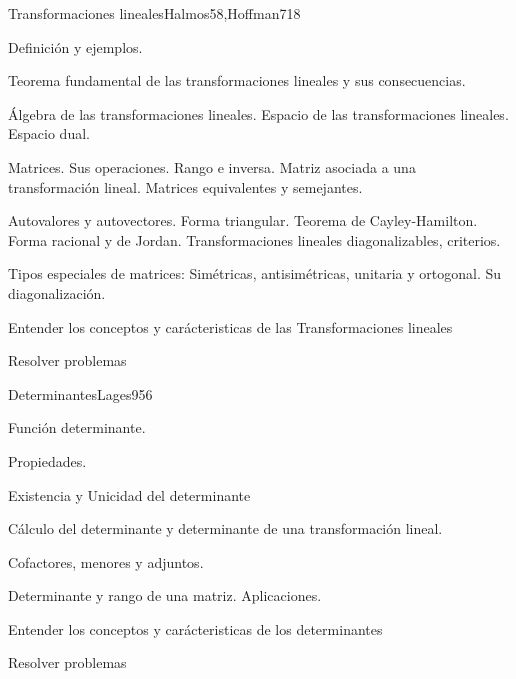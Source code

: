\begin{syllabus}
\begin{unit}{Transformaciones lineales}{Halmos58,Hoffman71}{8}
   \begin{topics}
         \item  Definición y ejemplos.
	 \item  Teorema fundamental de las transformaciones lineales y sus consecuencias.
         \item  Álgebra de las transformaciones lineales. Espacio de las transformaciones lineales. Espacio dual.
	 \item  Matrices. Sus operaciones. Rango e inversa. Matriz asociada a una transformación lineal. Matrices equivalentes y semejantes.
         \item  Autovalores y autovectores. Forma triangular. Teorema de Cayley-Hamilton. Forma racional y de  Jordan. Transformaciones lineales diagonalizables, criterios.
	 \item  Tipos especiales de matrices: Simétricas, antisimétricas, unitaria y ortogonal. Su diagonalización.
   \end{topics}

   \begin{unitgoals}
         \item  Entender los conceptos y carácteristicas de las Transformaciones lineales
         \item  Resolver problemas
   \end{unitgoals}
\end{unit}

\begin{unit}{Determinantes}{Lages95}{6}
   \begin{topics}
         \item  Función determinante.
	 \item  Propiedades.
         \item  Existencia y Unicidad del determinante
	 \item  Cálculo del determinante y determinante de una transformación lineal.
         \item  Cofactores, menores y adjuntos.
	\item Determinante y rango de una matriz. Aplicaciones.
   \end{topics}

   \begin{unitgoals}
         \item  Entender los conceptos y carácteristicas de los determinantes
         \item  Resolver problemas
   \end{unitgoals}
\end{unit}


\end{syllabus}
